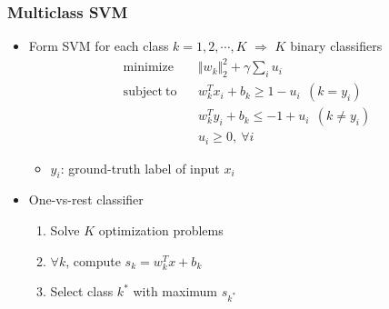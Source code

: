 \subsubsection*{Multiclass SVM}
\begin{itemize}
    \item Form SVM for each class $k=1,2,\cdots,K$ $\Rightarrow$ $K$ binary classifiers
    \begin{equation}\begin{aligned}
        \mathrm{minimize}~~&~~\Vert w_k\Vert_2^2+\gamma\sum_{i}u_i \\
        \mathrm{subject~to}~~&~~w_k^Tx_i+b_k\geq1-u_i~~(k=y_i) \\
            &~~w_k^Ty_i+b_k\leq-1+u_i~~(k\neq y_i) \\
            &~~u_i\geq0,~\forall i
    \end{aligned}\end{equation}
    \begin{itemize}
        \item $y_i$: ground-truth label of input $x_i$
    \end{itemize}
    \item One-vs-rest classifier
    \begin{enumerate}
        \item Solve $K$ optimization problems
        \item $\forall k$, compute $s_k=w_k^Tx+b_k$
        \item Select class $k^\ast$ with maximum $s_{k^\ast}$
    \end{enumerate}
    \begin{figures}
    \end{figures}
\end{itemize}

